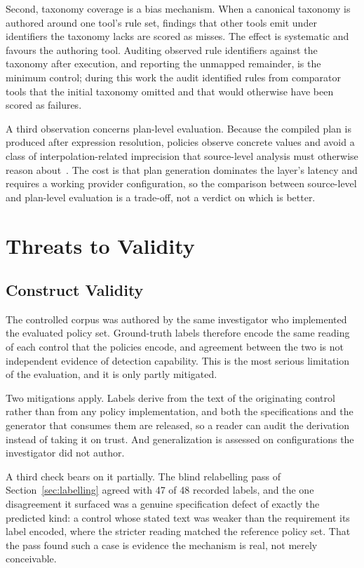 \documentclass[journal]{IEEEtran}
\begin{document}
Second, taxonomy coverage is a bias mechanism. When a canonical taxonomy is
authored around one tool's rule set, findings that other tools emit under
identifiers the taxonomy lacks are scored as misses. The effect is systematic and
favours the authoring tool. Auditing observed rule identifiers against the
taxonomy after execution, and reporting the unmapped remainder, is the minimum
control; during this work the audit identified rules from comparator tools that
the initial taxonomy omitted and that would otherwise have been scored as
failures.

A third observation concerns plan-level evaluation. Because the compiled plan is
produced after expression resolution, policies observe concrete values and avoid
a class of interpolation-related imprecision that source-level analysis must
otherwise reason about~\cite{opdebeeck2023control}. The cost is that plan
generation dominates the layer's latency and requires a working provider
configuration, so the comparison between source-level and plan-level evaluation
is a trade-off, not a verdict on which is better.

\section{Threats to Validity}

\subsection{Construct Validity}
\label{sec:construct}
The controlled corpus was authored by the same investigator who implemented the
evaluated policy set. Ground-truth labels therefore encode the same reading of
each control that the policies encode, and agreement between the two is not
independent evidence of detection capability. This is the most serious limitation
of the evaluation, and it is only partly mitigated.

Two mitigations apply. Labels derive from the text of the originating control
rather than from any policy implementation, and both the specifications and the
generator that consumes them are released, so a reader can audit the derivation
instead of taking it on trust. And generalization is assessed on configurations the
investigator did not author.

A third check bears on it partially. The blind relabelling pass of
Section~\ref{sec:labelling} agreed with 47 of 48 recorded labels, and the one
disagreement it surfaced was a genuine specification defect of exactly the
predicted kind: a control whose stated text was weaker than the requirement its
label encoded, where the stricter reading matched the reference policy set. That the
pass found such a case is evidence the mechanism is real, not merely conceivable.
\end{document}
